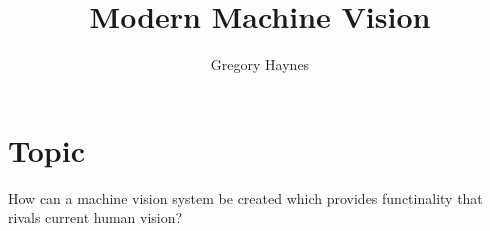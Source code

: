 \documentclass[a4paper,10pt]{article}
\title{Modern Machine Vision}
\author{Gregory Haynes}
\begin{document}
\maketitle

\section*{Topic}
How can a machine vision system be created which provides functinality that rivals current human vision?

\nocite{*}



\end{document}

